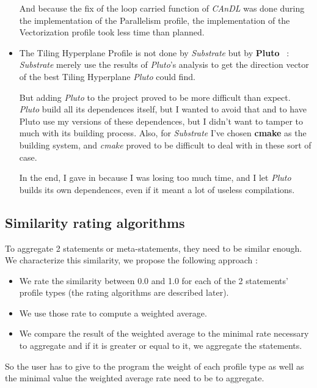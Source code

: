 \documentclass[paper=a4, fontsize=11.5pt]{scrartcl}
\numberwithin{equation}{section}        %
\numberwithin{figure}{section}          %
\numberwithin{table}{section}               %
\begin{document}
\begin{itemize}
            And because the fix of the loop carried function of \textit{CAnDL} was done during
            the implementation of the Parallelism profile, the implementation of the
            Vectorization profile took less time than planned.
        \item The Tiling Hyperplane Profile is not done by \textit{Substrate} but by
            \textbf{Pluto}~\cite{pluto} : \textit{Substrate} merely use the results of
            \textit{Pluto}'s analysis to get the direction vector of the best Tiling Hyperplane
            \textit{Pluto} could find.

            But adding \textit{Pluto} to the project proved to be more difficult than expect.
            \textit{Pluto} build all its dependences itself, but I wanted to avoid that and
            to have Pluto use my versions of these dependences, but I didn't want to tamper
            to much with its building process. Also, for \textit{Substrate} I've chosen \textbf{cmake}
            as the building system, and \textit{cmake} proved to be difficult to deal with in these
            sort of case.

            In the end, I gave in because I was losing too much time, and I let \textit{Pluto} builds
            its own dependences, even if it meant a lot of useless compilations.
    \end{itemize}
    
    \subsection{Similarity rating algorithms}
    To aggregate 2 statements or meta-statements, they need to be similar enough. We characterize
    this similarity, we propose the following approach :
    \begin{itemize}
        \item We rate the similarity between 0.0 and 1.0 for each of the 2 statements' profile types
            (the rating algorithms are described later).
        \item We use those rate to compute a weighted average.
        \item We compare the result of the weighted average to the minimal rate necessary
            to aggregate and if it is greater or equal to it, we aggregate the statements.
    \end{itemize}
    So the user has to give to the program the weight of each profile type as well as the
    minimal value the weighted average rate need to be to aggregate.
\end{document}
